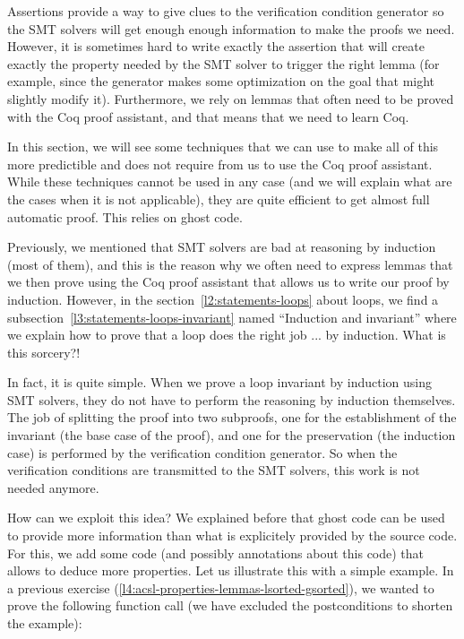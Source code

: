 Assertions provide a way to give clues to the verification condition generator
so the SMT solvers will get enough enough information to make the proofs we
need. However, it is sometimes hard to write exactly the assertion that will
create exactly the property needed by the SMT solver to trigger the right lemma
(for example, since the generator makes some optimization on the goal that
might slightly modify it). Furthermore, we rely on lemmas that often need to be
proved with the Coq proof assistant, and that means that we need to learn Coq.



In this section, we will see some techniques that we can use to make all of this
more predictible and does not require from us to use the Coq proof assistant.
While these techniques cannot be used in any case (and we will explain what are
the cases when it is not applicable), they are quite efficient to get almost
full automatic proof. This relies on ghost code.






Previously, we mentioned that SMT solvers are bad at reasoning by induction
(most of them), and this is the reason why we often need to express lemmas that
we then prove using the Coq proof assistant that allows us to write our proof
by induction. However, in the section~\ref{l2:statements-loops} about loops, we
find a subsection~\ref{l3:statements-loops-invariant} named ``Induction and
invariant'' where we explain how to prove that a loop does the right job ... by
induction. What is this sorcery?!




In fact, it is quite simple. When we prove a loop invariant by induction using
SMT solvers, they do not have to perform the reasoning by induction themselves.
The job of splitting the proof into two subproofs, one for the establishment of
the invariant (the base case of the proof), and one for the preservation (the
induction case) is performed by the verification condition generator. So when
the verification conditions are transmitted to the SMT solvers, this work is not
needed anymore.




How can we exploit this idea? We explained before that ghost code can be used to
provide more information than what is explicitely provided by the source code.
For this, we add some code (and possibly annotations about this code) that
allows to deduce more properties. Let us illustrate this with a simple example.
In a previous exercise (\ref{l4:acsl-properties-lemmas-lsorted-gsorted}), we
wanted to prove the following function call (we have excluded the postconditions
to shorten the example):



